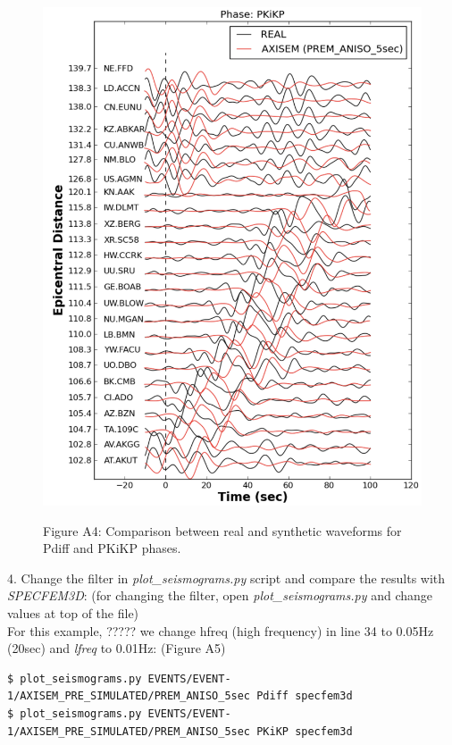 \documentclass{article}
\begin{document}
\begin{figure}
\begin{minipage}{.5\textwidth}
  \includegraphics[width=1.\linewidth]{AXISEMTutorial-fig009.pdf}
\end{minipage}
\begin{center}
{\small{}Figure A4: Comparison between real and synthetic waveforms for Pdiff and 
PKiKP phases.}
\end{center}
\end{figure}


4. Change the filter in \textit{plot\_seismograms.py} script and compare the results with 
\textit{SPECFEM3D}: (for changing the filter, open \textit{plot\_seismograms.py} and change 
values at top of the file) \\
For this example, ????? we change hfreq (high frequency) in line 34 to 0.05Hz (20sec) and \textit{lfreq }to 0.01Hz: (Figure 
A5)

\begin{verbatim}
$ plot_seismograms.py EVENTS/EVENT-1/AXISEM_PRE_SIMULATED/PREM_ANISO_5sec Pdiff specfem3d
$ plot_seismograms.py EVENTS/EVENT-1/AXISEM_PRE_SIMULATED/PREM_ANISO_5sec PKiKP specfem3d
\end{verbatim}
\end{document}
